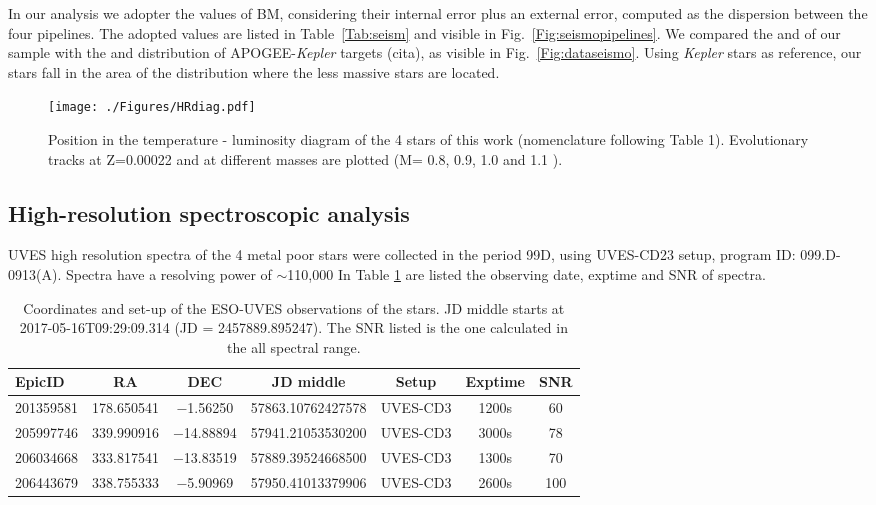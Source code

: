 \documentclass{aa}
\begin{document}
In our analysis we adopter the values of BM, considering their internal error plus an external error, computed as the dispersion between the four pipelines.  The adopted values are listed in Table~\ref{Tab:seism} and visible in Fig.~\ref{Fig:seismopipelines}. We compared the \deltanu and \numax of our sample with the  \deltanu and \numax distribution of APOGEE-{\it Kepler} targets (cita), as visible in Fig.~\ref{Fig:dataseismo}. Using {\it Kepler} stars as reference, our stars fall in the area of the distribution where the less massive stars are located.    
   \begin{figure}
   \centering
   \texttt{[image: ./Figures/HRdiag.pdf]}
   \caption{Position in the temperature - luminosity diagram of the 4 stars of this work (nomenclature following Table 1). Evolutionary tracks at Z=0.00022 and at different masses are plotted (M= 0.8, 0.9, 1.0 and 1.1 \Msun).}
              \label{Fig:tracks}%
    \end{figure}

\subsection{High-resolution spectroscopic analysis}
UVES high resolution spectra of the 4 metal poor stars were collected in the period 99D, using UVES-CD23 setup, program ID: 099.D-0913(A). Spectra have a resolving power of $\sim$110,000 In Table \ref{Tab:ESO} are listed the observing date, exptime and SNR of spectra. 
\begin{table}
\caption{Coordinates and set-up of the ESO-UVES observations of the stars. JD middle starts at 2017-05-16T09:29:09.314 (JD = 2457889.895247). The SNR listed is the one calculated in the all spectral range.}
\label{Tab:ESO}
\centering          
\begin{tabular}{lcccccc}     %
\hline\hline       
EpicID & RA & DEC  & JD middle & Setup & Exptime & SNR \\ \hline
201359581 & 178.650541 &  $-$1.56250& 57863.10762427578 & UVES-CD3 & 1200s & 60\\
205997746 & 339.990916 & $-$14.88894& 57941.21053530200 & UVES-CD3 & 3000s & 78\\
206034668 & 333.817541 & $-$13.83519& 57889.39524668500 & UVES-CD3 & 1300s & 70\\
206443679 & 338.755333 &  $-$5.90969& 57950.41013379906 & UVES-CD3 & 2600s &100\\
\hline
\end{tabular}
\end{table}
\end{document}
